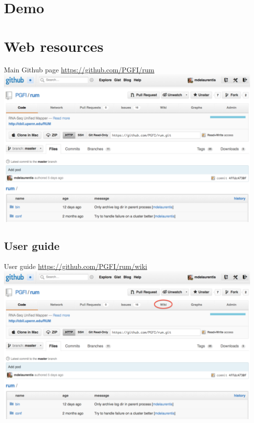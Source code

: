 \documentclass{beamer}
\begin{document}

\section{Demo}

\section{Web resources}

\begin{frame}{Main Github page}
  \url{https://github.com/PGFI/rum}
  \includegraphics[scale=0.2]{github-main.png}
\end{frame}

\subsection{User guide}

\centering
\begin{frame}{User guide}
  \url{https://github.com/PGFI/rum/wiki}
  \includegraphics[scale=0.2]{github-main-wiki.png}
\end{frame}
\end{document}
